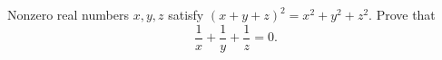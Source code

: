 Nonzero real numbers $x,y,z$ satisfy $(x+y+z)^2=x^2+y^2+z^2$. Prove that
\[\dfrac1x+\dfrac1y+\dfrac1z=0.\]
